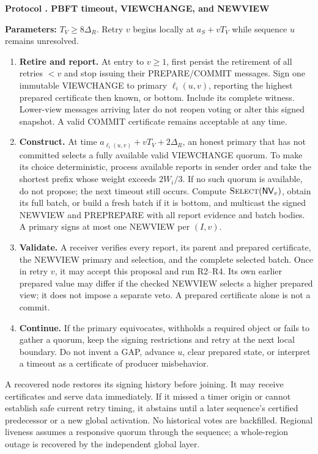 \documentclass[11pt,a4paper,onecolumn]{article}
\newcommand{\NV}{\mathsf{NV}}
\newcommand{\Proc}[1]{\textnormal{\textsc{#1}}}
\theoremstyle{remark}\newtheorem{example}[definition]{Example}
\newcounter{protocol}
\newenvironment{protocol}[2]{\refstepcounter{protocol}\label{#1}\begin{mdframed}[nobreak=true,linewidth=.6pt,skipabove=10pt,skipbelow=10pt,innertopmargin=8pt,innerbottommargin=8pt]\small\raggedright\noindent\textbf{Protocol \theprotocol. #2}\par\smallskip}{\end{mdframed}}
\begin{document}
\begin{protocol}{alg:localchange}{PBFT timeout, VIEWCHANGE, and NEWVIEW}
\textbf{Parameters:} $T_V\geq8\Delta_R$. Retry $v$ begins locally at
$a_S+vT_V$ while sequence $u$ remains unresolved.
\begin{enumerate}[label=\textbf{V\arabic*.}]
\item \textbf{Retire and report.} At entry to $v\geq1$, first persist the
retirement of all retries $<v$ and stop issuing their PREPARE/COMMIT messages.
Sign one immutable VIEWCHANGE to primary $\ell_i(u,v)$, reporting the highest
prepared certificate then known, or bottom. Include its complete witness.
Lower-view messages arriving later do not reopen voting or alter this signed
snapshot. A valid COMMIT certificate remains acceptable at any time.
\item \textbf{Construct.} At time $a_{\ell_i(u,v)}+vT_V+2\Delta_R$, an honest
primary that has not committed selects a fully available valid VIEWCHANGE
quorum. To make its choice deterministic, process available reports in sender
order and take the shortest prefix whose weight exceeds $2W_i/3$.
If no such quorum is available, do not propose; the next timeout still occurs.
Compute $\Proc{Select}(\NV_v)$, obtain its full batch, or build a fresh batch
if it is bottom, and multicast the signed NEWVIEW and PREPREPARE with all
report evidence and batch bodies. A primary signs at most one NEWVIEW per $(I,v)$.
\item \textbf{Validate.} A receiver verifies every report, its parent and
prepared certificate, the NEWVIEW primary and selection, and the complete
selected batch. Once in retry $v$, it may accept this proposal and run R2--R4.
Its own earlier prepared value may differ if the checked NEWVIEW selects a
higher prepared view; it does not impose a separate veto. A prepared
certificate alone is not a commit.
\item \textbf{Continue.} If the primary equivocates, withholds a required
object or fails to gather a quorum, keep the signing restrictions and retry at
the next local boundary. Do not invent a GAP, advance $u$, clear prepared
state, or interpret a timeout as a certificate of producer misbehavior.
\end{enumerate}
\end{protocol}

A recovered node restores its signing history before joining. It may receive
certificates and serve data immediately. If it missed a timer origin or cannot
establish safe current retry timing, it abstains until a later sequence's
certified predecessor or a new global activation. No historical votes are
backfilled. Regional liveness assumes a responsive quorum through the sequence;
a whole-region outage is recovered by the independent global layer.
\end{document}
